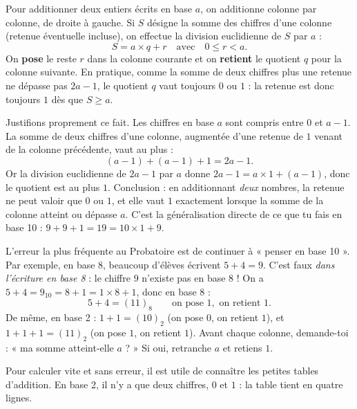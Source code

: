 \documentclass[11pt]{article}
\newcounter{popsec}
\newcounter{popsub}
\newcommand{\courssub}[1]{%
  \stepcounter{popsub}%
  \par\vspace{9pt}\noindent{\popxbold\fontsize{11.5}{13}\selectfont\color{popink}{\color{poporange}\thepopsec.\thepopsub}\hspace{6pt}#1}\par\nopagebreak\vspace{4pt}
}
\begin{document}
\begin{propriete}
Pour additionner deux entiers écrits en base $a$, on additionne colonne par colonne, de droite à gauche. Si $S$ désigne la somme des chiffres d'une colonne (retenue éventuelle incluse), on effectue la division euclidienne de $S$ par $a$ :
\[ S = a \times q + r \quad \text{avec} \quad 0 \le r < a. \]
On \textbf{pose} le reste $r$ dans la colonne courante et on \textbf{retient} le quotient $q$ pour la colonne suivante. En pratique, comme la somme de deux chiffres plus une retenue ne dépasse pas $2a - 1$, le quotient $q$ vaut toujours $0$ ou $1$ : la retenue est donc toujours $1$ dès que $S \ge a$.
\end{propriete}

\begin{experience}
Justifions proprement ce fait. Les chiffres en base $a$ sont compris entre $0$ et $a-1$. La somme de deux chiffres d'une colonne, augmentée d'une retenue de $1$ venant de la colonne précédente, vaut au plus :
\[ (a-1) + (a-1) + 1 = 2a - 1. \]
Or la division euclidienne de $2a - 1$ par $a$ donne $2a - 1 = a \times 1 + (a - 1)$, donc le quotient est au plus $1$. Conclusion : en additionnant \emph{deux} nombres, la retenue ne peut valoir que $0$ ou $1$, et elle vaut $1$ exactement lorsque la somme de la colonne atteint ou dépasse $a$. C'est la généralisation directe de ce que tu fais en base 10 : $9 + 9 + 1 = 19 = 10 \times 1 + 9$.
\end{experience}

\begin{attention}
L'erreur la plus fréquente au Probatoire est de continuer à « penser en base 10 ». Par exemple, en base 8, beaucoup d'élèves écrivent $5 + 4 = 9$. C'est faux \emph{dans l'écriture en base 8} : le chiffre $9$ n'existe pas en base 8 ! On a $5 + 4 = 9_{10} = 8 + 1 = 1 \times 8 + 1$, donc en base 8 :
\[ 5 + 4 = (11)_8 \qquad \text{on pose } 1, \text{ on retient } 1. \]
De même, en base 2 : $1 + 1 = (10)_2$ (on pose $0$, on retient $1$), et $1 + 1 + 1 = (11)_2$ (on pose $1$, on retient $1$). Avant chaque colonne, demande-toi : « ma somme atteint-elle $a$ ? » Si oui, retranche $a$ et retiens $1$.
\end{attention}

\courssub{Tables d'addition en base 2 et en base 8}

Pour calculer vite et sans erreur, il est utile de connaître les petites tables d'addition. En base 2, il n'y a que deux chiffres, $0$ et $1$ : la table tient en quatre lignes.
\end{document}
